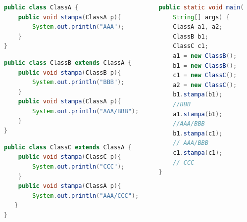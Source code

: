 \documentclass{beamer}
\begin{document}
\begin{frame}[fragile]
\begin{columns}
\begin{column}{0.6\textwidth}
\begin{lstlisting}[language=Java,escapechar=|]
public class ClassA {
    public void stampa(ClassA p){
        System.out.println("AAA");
    }
}
\end{lstlisting}
\begin{lstlisting}[language=Java,escapechar=|]
public class ClassB extends ClassA {
    public void stampa(ClassB p){
        System.out.println("BBB");
    }
    public void stampa(ClassA p){
        System.out.println("AAA/BBB");
    }
}
\end{lstlisting}
\begin{lstlisting}[language=Java,escapechar=|]
public class ClassC extends ClassA {
    public void stampa(ClassC p){
        System.out.println("CCC");
    }
    public void stampa(ClassA p){
        System.out.println("AAA/CCC");
   }
}
\end{lstlisting}
\end{column}
\begin{column}{0.4\textwidth}
\begin{lstlisting}[language=Java,escapechar=|]
public static void main(
    String[] args) {
    ClassA a1, a2;
    ClassB b1;
    ClassC c1;
    a1 = new ClassB();
    b1 = new ClassB();
    c1 = new ClassC();
    a2 = new ClassC();
    b1.stampa(b1); 
    //BBB
    a1.stampa(b1);  
    //AAA/BBB
    b1.stampa(c1); 
    // AAA/BBB
    c1.stampa(c1); 
    // CCC
}
\end{lstlisting}
\end{column}
\end{columns}
\end{frame}
\end{document}
